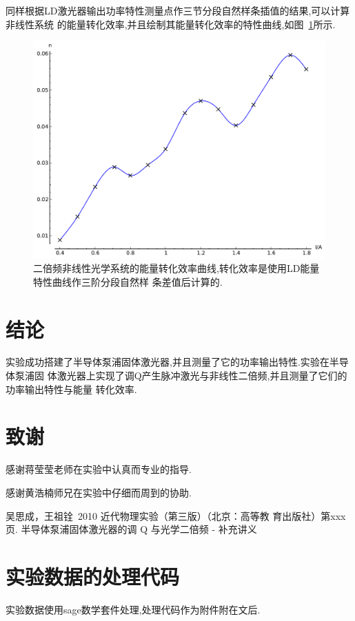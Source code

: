 \documentclass[aps,pre,12pt,preprint,onecolumn,showpacs,showkeys]{revtex4-1}
\begin{document}
同样根据LD激光器输出功率特性测量点作三节分段自然样条插值的结果,可以计算非线性系统
的能量转化效率,并且绘制其能量转化效率的特性曲线,如图~\ref{fig:plotn2}所示.

\begin{figure}[htbp]
    \includegraphics[width=\textwidth]{plot4.pdf}
    \caption{\label{fig:plotn2}%
        二倍频非线性光学系统的能量转化效率曲线,转化效率是使用LD能量特性曲线作三阶分段自然样
        条差值后计算的.
    }
\end{figure}
\section{结论}

实验成功搭建了半导体泵浦固体激光器,并且测量了它的功率输出特性.实验在半导体泵浦固
体激光器上实现了调Q产生脉冲激光与非线性二倍频,并且测量了它们的功率输出特性与能量
转化效率.
 
\section{致谢}

感谢蒋莹莹老师在实验中认真而专业的指导.

感谢黄浩楠师兄在实验中仔细而周到的协助.
 
\begin{thebibliography}{}
 吴思成，王祖铨~2010 近代物理实验（第三版）（北京：高等教
育出版社）第xxx页.  
 半导体泵浦固体激光器的调 Q 与光学二倍频 - 补充讲义
\end{thebibliography}
 
\clearpage
\appendix
 
 \section{实验数据的处理代码}

实验数据使用sage数学套件处理,处理代码作为附件附在文后.

\newpage


 
\end{document}
